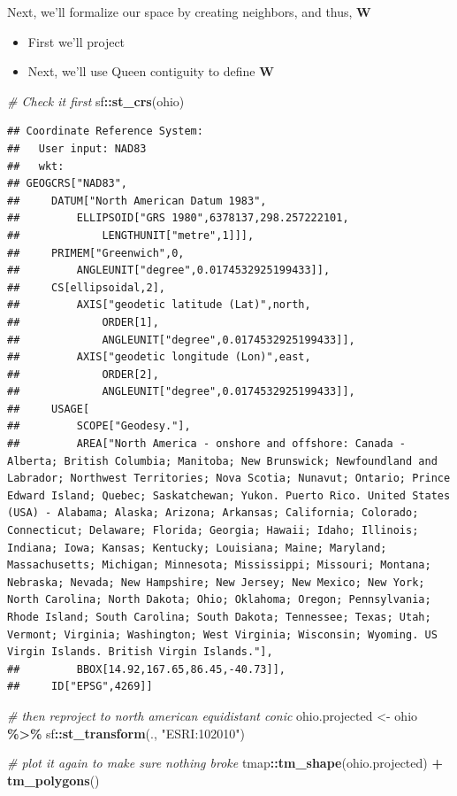 \documentclass[
]{article}
\newenvironment{Shaded}{\begin{snugshade}}{\end{snugshade}}
\newcommand{\CommentTok}[1]{\textcolor[rgb]{0.56,0.35,0.01}{\textit{#1}}}
\newcommand{\FunctionTok}[1]{\textcolor[rgb]{0.13,0.29,0.53}{\textbf{#1}}}
\newcommand{\NormalTok}[1]{#1}
\newcommand{\OtherTok}[1]{\textcolor[rgb]{0.56,0.35,0.01}{#1}}
\newcommand{\SpecialCharTok}[1]{\textcolor[rgb]{0.81,0.36,0.00}{\textbf{#1}}}
\newcommand{\StringTok}[1]{\textcolor[rgb]{0.31,0.60,0.02}{#1}}
\providecommand{\tightlist}{%
  \setlength{\itemsep}{0pt}\setlength{\parskip}{0pt}}
\begin{document}
Next, we'll formalize our space by creating neighbors, and thus,
\textbf{W}

\begin{itemize}
\tightlist
\item
  First we'll project
\item
  Next, we'll use Queen contiguity to define \textbf{W}
\end{itemize}

\begin{Shaded}
\begin{Highlighting}[]
\CommentTok{\# Check it first}
\NormalTok{sf}\SpecialCharTok{::}\FunctionTok{st\_crs}\NormalTok{(ohio) }
\end{Highlighting}
\end{Shaded}

\begin{verbatim}
## Coordinate Reference System:
##   User input: NAD83 
##   wkt:
## GEOGCRS["NAD83",
##     DATUM["North American Datum 1983",
##         ELLIPSOID["GRS 1980",6378137,298.257222101,
##             LENGTHUNIT["metre",1]]],
##     PRIMEM["Greenwich",0,
##         ANGLEUNIT["degree",0.0174532925199433]],
##     CS[ellipsoidal,2],
##         AXIS["geodetic latitude (Lat)",north,
##             ORDER[1],
##             ANGLEUNIT["degree",0.0174532925199433]],
##         AXIS["geodetic longitude (Lon)",east,
##             ORDER[2],
##             ANGLEUNIT["degree",0.0174532925199433]],
##     USAGE[
##         SCOPE["Geodesy."],
##         AREA["North America - onshore and offshore: Canada - Alberta; British Columbia; Manitoba; New Brunswick; Newfoundland and Labrador; Northwest Territories; Nova Scotia; Nunavut; Ontario; Prince Edward Island; Quebec; Saskatchewan; Yukon. Puerto Rico. United States (USA) - Alabama; Alaska; Arizona; Arkansas; California; Colorado; Connecticut; Delaware; Florida; Georgia; Hawaii; Idaho; Illinois; Indiana; Iowa; Kansas; Kentucky; Louisiana; Maine; Maryland; Massachusetts; Michigan; Minnesota; Mississippi; Missouri; Montana; Nebraska; Nevada; New Hampshire; New Jersey; New Mexico; New York; North Carolina; North Dakota; Ohio; Oklahoma; Oregon; Pennsylvania; Rhode Island; South Carolina; South Dakota; Tennessee; Texas; Utah; Vermont; Virginia; Washington; West Virginia; Wisconsin; Wyoming. US Virgin Islands. British Virgin Islands."],
##         BBOX[14.92,167.65,86.45,-40.73]],
##     ID["EPSG",4269]]
\end{verbatim}

\begin{Shaded}
\begin{Highlighting}[]
\CommentTok{\# then reproject to north american equidistant conic}
\NormalTok{ohio.projected }\OtherTok{\textless{}{-}}\NormalTok{ ohio }\SpecialCharTok{\%\textgreater{}\%}\NormalTok{ sf}\SpecialCharTok{::}\FunctionTok{st\_transform}\NormalTok{(., }\StringTok{"ESRI:102010"}\NormalTok{)}

\CommentTok{\# plot it again to make sure nothing broke}
\NormalTok{tmap}\SpecialCharTok{::}\FunctionTok{tm\_shape}\NormalTok{(ohio.projected) }\SpecialCharTok{+} \FunctionTok{tm\_polygons}\NormalTok{()}
\end{Highlighting}
\end{Shaded}
\end{document}
